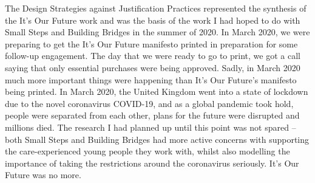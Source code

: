 The Design Strategies against Justification Practices represented the synthesis of the It’s Our Future work and was the basis of the work I had hoped to do with Small Steps and Building Bridges in the summer of 2020. In March 2020, we were preparing to get the It’s Our Future manifesto printed in preparation for some follow-up engagement. The day that we were ready to go to print, we got a call saying that only essential purchases were being approved. Sadly, in March 2020 much more important things were happening than It’s Our Future’s manifesto being printed. In March 2020, the United Kingdom went into a state of lockdown due to the novel coronavirus COVID-19, and as a global pandemic took hold, people were separated from each other, plans for the future were disrupted and millions died.  The research I had planned up until this point was not spared – both Small Steps and Building Bridges had more active concerns with supporting the care-experienced young people they work with, whilst also modelling the importance of taking the restrictions around the coronavirus seriously. It’s Our Future was no more. 

